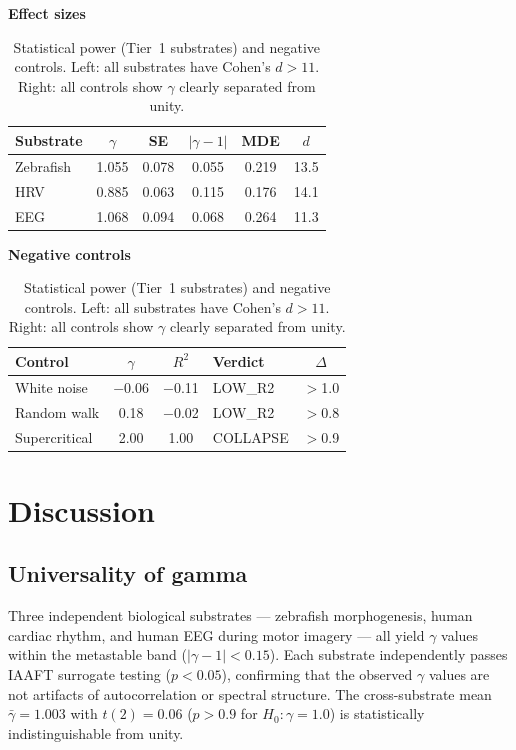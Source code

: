 \documentclass[11pt,a4paper,twocolumn]{article}
\begin{document}
\begin{table}[!tp]
\centering
\caption{Statistical power (Tier~1 substrates) and negative controls. Left: all substrates have Cohen's $d > 11$. Right: all controls show $\gamma$ clearly separated from unity.}
\label{tab:power_controls}
\small
\begin{minipage}[t]{0.48\textwidth}
\centering
\textbf{Effect sizes}\\[0.3em]
\begin{tabular}{@{}l c c c c c@{}}
\toprule
\textbf{Substrate} & $\gamma$ & SE & $|\gamma\!-\!1|$ & MDE & $d$ \\
\midrule
Zebrafish & 1.055 & 0.078 & 0.055 & 0.219 & 13.5 \\
HRV & 0.885 & 0.063 & 0.115 & 0.176 & 14.1 \\
EEG & 1.068 & 0.094 & 0.068 & 0.264 & 11.3 \\
\bottomrule
\end{tabular}
\end{minipage}%
\hfill
\begin{minipage}[t]{0.48\textwidth}
\centering
\textbf{Negative controls}\\[0.3em]
\begin{tabular}{@{}l c c l c@{}}
\toprule
\textbf{Control} & $\gamma$ & $R^2$ & \textbf{Verdict} & $\Delta$ \\
\midrule
White noise & $-$0.06 & $-$0.11 & LOW\_R2 & $>$1.0 \\
Random walk & 0.18 & $-$0.02 & LOW\_R2 & $>$0.8 \\
Supercritical & 2.00 & 1.00 & COLLAPSE & $>$0.9 \\
\bottomrule
\end{tabular}
\end{minipage}
\end{table}

\section{Discussion}

\subsection{Universality of gamma}

Three independent biological substrates --- zebrafish morphogenesis, human cardiac rhythm, and human EEG during motor imagery --- all yield $\gamma$ values within the metastable band ($|\gamma - 1| < 0.15$). Each substrate independently passes IAAFT surrogate testing ($p < 0.05$), confirming that the observed $\gamma$ values are not artifacts of autocorrelation or spectral structure. The cross-substrate mean $\bar{\gamma} = 1.003$ with $t(2) = 0.06$ ($p > 0.9$ for $H_0\!: \gamma = 1.0$) is statistically indistinguishable from unity.
\end{document}
